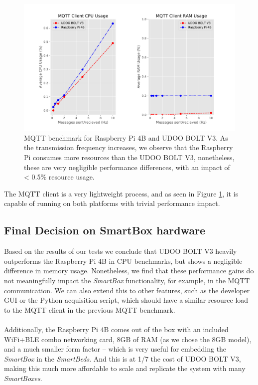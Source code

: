 \begin{figure}[H]
    \centering
    \includegraphics[width=\linewidth]{images/mqtt_test_results.pdf}
    \caption[\acs{MQTT} benchmark for Raspberry Pi 4B and UDOO BOLT V3.]{\acs{MQTT} benchmark for Raspberry Pi 4B and UDOO BOLT V3. As the transmission frequency increases, we observe that the Raspberry Pi consumes more resources than the UDOO BOLT V3, nonetheless, these are very negligible performance differences, with an impact of < 0.5\% resource usage.}
    \label{fig:mqtt-tests}
\end{figure}

The \acs{MQTT} client is a very lightweight process, and as seen in Figure \ref{fig:mqtt-tests}, it is capable of running on both platforms with trivial performance impact.

\subsection{Final Decision on SmartBox hardware}

Based on the results of our tests we conclude that UDOO BOLT V3 heavily outperforms the Raspberry Pi 4B in CPU benchmarks, but shows a negligible difference in memory usage. Nonetheless, we find that these performance gains do not meaningfully impact the \textit{SmartBox} functionality, for example, in the \acs{MQTT} communication. We can also extend this to other features, such as the developer \acs{GUI} or the Python acquisition script, which should have a similar resource load to the \acs{MQTT} client in the previous \acs{MQTT} benchmark.

\paragraph{} Additionally, the Raspberry Pi 4B comes out of the box with an included WiFi+\acs{BLE} combo networking card, 8GB of RAM (as we chose the 8GB model), and a much smaller form factor -- which is very useful for embedding the \textit{SmartBox} in the \textit{SmartBeds}. And this is at 1/7 the cost of UDOO BOLT V3, making this much more affordable to scale and replicate the system with many \textit{SmartBoxes}.

